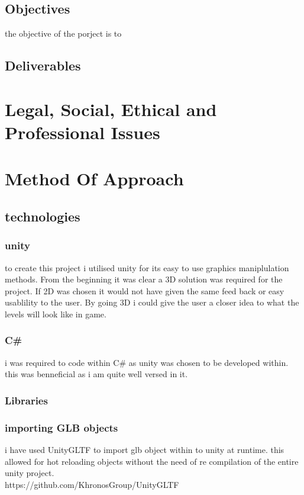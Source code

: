 \subsection{Objectives}
the objective of the porject is to 
\subsection{Deliverables}

\section{Legal, Social, Ethical and Professional Issues}

\section{Method Of Approach}

\subsection{technologies}
\subsubsection{unity}
to create this project i utilised unity for its easy to use graphics maniplulation methods. From the beginning it was clear a 3D solution was required for the project. If 2D was chosen it would not have given the same feed back or easy usablility to the user. By going 3D i could give the user a closer idea to what the levels will look like in game.   
\subsubsection{C\#}
i was required to code within C\# as unity was chosen to be developed within. this was benneficial as i am quite well versed in it.

\subsubsection{Libraries}
\subsubsection*{importing GLB objects}
i have used UnityGLTF to import glb object within to unity at runtime. this allowed for hot reloading objects without the need of re compilation of the entire unity project.\\
https://github.com/KhronosGroup/UnityGLTF
